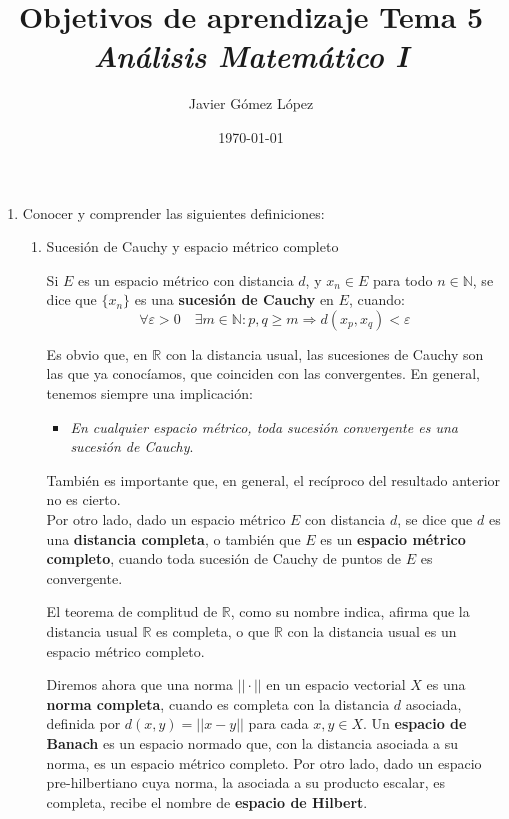 \documentclass[a4paper, 12pt]{article}
\title{\textbf{Objetivos de aprendizaje Tema 5} \\ \textit{Análisis Matemático I}}
\author{Javier Gómez López}
\date{\today}
\begin{document}
\maketitle

\begin{enumerate}[label=\textbf{\arabic*}.]

\item Conocer y comprender las siguientes definiciones:
	\begin{enumerate}[label=\textit{\alph*})]
	
	\item Sucesión de Cauchy y espacio métrico completo
	
	Si \(E\) es un espacio métrico con distancia \(d\), y \(x_n \in E\) para todo \(n \in \mathbb{N}\), se dice que \(\{x_n\}\) es una \textbf{sucesión de Cauchy} en \(E\), cuando:
	\[
		\forall \varepsilon > 0 \quad \exists m \in \mathbb{N} : p,q \geq m \Rightarrow d(x_p,x_q) < \varepsilon
	\]
	
	Es obvio que, en \(\mathbb{R}\) con la distancia usual, las sucesiones de Cauchy son las que ya conocíamos, que coinciden con las convergentes. En general, tenemos siempre una implicación:
	\begin{itemize}
		\item \textit{En cualquier espacio métrico, toda sucesión convergente es una sucesión de Cauchy}.
	\end{itemize}
	
	También es importante que, en general, el recíproco del resultado anterior no es cierto. \\
	
	Por otro lado, dado un espacio métrico \(E\) con distancia \(d\), se dice que \(d\) es una \textbf{distancia completa}, o también que \(E\) es un \textbf{espacio métrico completo}, cuando toda sucesión de Cauchy de puntos de \(E\) es convergente.
	
	El teorema de complitud de \(\mathbb{R}\), como su nombre indica, afirma que la distancia usual \(\mathbb{R}\) es completa, o que \(\mathbb{R}\) con la distancia usual es un espacio métrico completo.
	
	Diremos ahora que una norma \(||\cdot||\) en un espacio vectorial \(X\) es una \textbf{norma completa}, cuando es completa con la distancia \(d\) asociada, definida por \(d(x,y) = ||x-y||\) para cada \(x,y \in X\). Un \textbf{espacio de Banach} es un espacio normado que, con la distancia asociada a su norma, es un espacio métrico completo. Por otro lado, dado un espacio pre-hilbertiano cuya norma, la asociada a su producto escalar, es completa, recibe el nombre de \textbf{espacio de Hilbert}.
	

\end{enumerate}
\end{enumerate}
\end{document}
